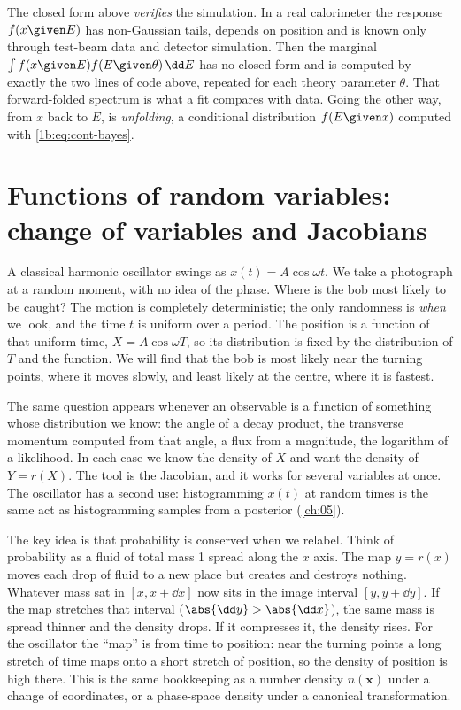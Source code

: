 \begin{inpractice}
The closed form above \emph{verifies} the simulation. In a real calorimeter
the response $f(x\given E)$ has non-Gaussian tails, depends on position and
is known only through test-beam data and detector simulation. Then the
marginal $\int f(x\given E)f(E\given\theta)\,\dd E$ has no closed form and
is computed by exactly the two lines of code above, repeated for each
theory parameter $\theta$. That forward-folded spectrum is what a fit
compares with data. Going the other way, from $x$ back to $E$, is
\emph{unfolding}, a conditional distribution $f(E\given x)$ computed with
\eqref{1b:eq:cont-bayes}.
\end{inpractice}
\section{Functions of random variables: change of variables and Jacobians}
\label{1b:sec:transform}

A classical harmonic oscillator swings as $x(t)=A\cos\omega t$. We take a
photograph at a random moment, with no idea of the phase. Where is the bob
most likely to be caught? The motion is completely deterministic; the only
randomness is \emph{when} we look, and the time $t$ is uniform over a period.
The position is a function of that uniform time, $X=A\cos\omega T$, so its
distribution is fixed by the distribution of $T$ and the function. We will
find that the bob is most likely near the turning points, where it moves
slowly, and least likely at the centre, where it is fastest.

The same question appears whenever an observable is a function of something
whose distribution we know: the angle of a decay product, the transverse
momentum computed from that angle, a flux from a magnitude, the logarithm of
a likelihood. In each case we know the density of $X$ and want the density of
$Y=r(X)$. The tool is the Jacobian, and it works for several variables at
once. The oscillator has a second use: histogramming $x(t)$ at random times is
the same act as histogramming samples from a posterior (\cref{ch:05}).

The key idea is that probability is conserved when we relabel. Think of probability as a fluid of total mass 1 spread along the $x$ axis.
The map $y=r(x)$ moves each drop of fluid to a new place but creates and
destroys nothing. Whatever mass sat in $[x,x+\dd x]$ now sits in the image
interval $[y,y+\dd y]$. If the map stretches that interval
($\abs{\dd y}>\abs{\dd x}$), the same mass is spread thinner and the density
drops. If it compresses it, the density rises. For the oscillator the
``map'' is from time to position: near the turning points a long stretch of
time maps onto a short stretch of position, so the density of position is
high there. This is the same bookkeeping as a number density $n(\bm x)$
under a change of coordinates, or a phase-space density under a canonical
transformation.

